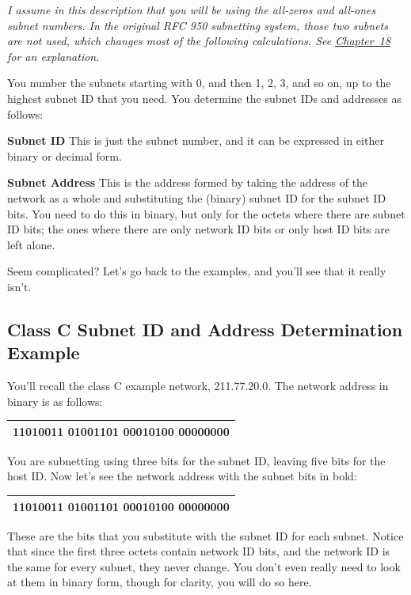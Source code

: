 \documentclass[b5paper,11pt]{memoir}
\begin{document}
{\emph{I assume in this description that you will be using the all-zeros
and all-ones subnet numbers. In the original RFC 950 subnetting system,
those two subnets are not used, which changes most of the following
calculations. See \protect\hyperlink{ch18.html}{Chapter~18} for an
explanation}}.

You number the subnets starting with 0, and then 1, 2, 3, and so on, up
to the highest subnet ID that you need. You determine the subnet IDs and
addresses as follows:

{\textbf{Subnet ID}} This is just the subnet number, and it can be
expressed in either binary or decimal form.

{\textbf{Subnet Address}} This is the address formed by taking the
address of the network as a whole and substituting the (binary) subnet
ID for the subnet ID bits. You need to do this in binary, but only for
the octets where there are subnet ID bits; the ones where there are only
network ID bits or only host ID bits are left alone.

Seem complicated? Let's go back to the examples, and you'll see that it
really isn't.

\subsection[class C Subnet ID and Address Determination
Example]{\texorpdfstring{\protect\hypertarget{ch19s04.htmlux5cux23class_c_subnet_id_and_address_determinat}{}{}Class
C Subnet ID and Address Determination
Example}{class C Subnet ID and Address Determination Example}}

You'll recall the class C example network, 211.77.20.0. The network
address in binary is as follows:

\begin{longtable}[]{@{}l@{}}
\toprule
\endhead
11010011 01001101 00010100 00000000\tabularnewline
\bottomrule
\end{longtable}

You are subnetting using three bits for the subnet ID, leaving five bits
for the host ID. Now let's see the network address with the subnet bits
in bold:

\begin{longtable}[]{@{}l@{}}
\toprule
\endhead
11010011 01001101 00010100 {\textbf{000}}00000\tabularnewline
\bottomrule
\end{longtable}

These are the bits that you substitute with the subnet ID for each
subnet. Notice that since the first three octets contain network ID
bits, and the network ID is the same for every subnet, they never
change. You don't even really need to look at them in binary form,
though for clarity, you will do so here.
\end{document}
